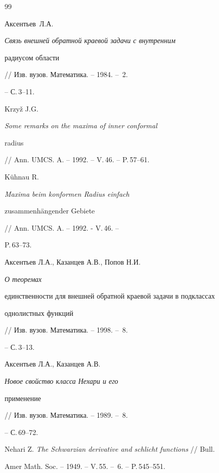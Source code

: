 \begin{thebibliography}{99}







Аксентьев~Л.А. {\em Связь внешней обратной краевой задачи с внутренним


радиусом области} // Изв. вузов. Математика. -- 1984. -- \No\,2.


-- С.\,3--11.







Krzy\v{z} J.G. {\em Some remarks on the maxima of inner conformal


radius} // Ann. UMCS. A. -- 1992. -- V.\,46. -- P.\,57--61.







K\"uhnau R. {\em Maxima beim konformen Radius einfach


zusammenh\"angender Gebiete} // Ann. UMCS. A. -- 1992. - V.\,46. --


P.\,63--73.







Аксентьев Л.А., Казанцев А.В., Попов Н.И. {\em О теоремах


единственности для внешней обратной краевой задачи в подклассах


однолистных функций} // Изв. вузов. Математика. -- 1998. -- \No\,8.


-- С.\,3--13.







Аксентьев Л.А., Казанцев А.В. {\em Новое свойство класса Нехари и его


применение} // Изв. вузов. Математика. -- 1989. -- \No\,8.


-- С.\,69--72.







Nehari Z. {\em The Schwarzian derivative and schlicht functions} // Bull.


Amer Math. Soc. -- 1949. -- V.\,55. -- \No\,6. -- P.\,545--551.






\end{thebibliography}
